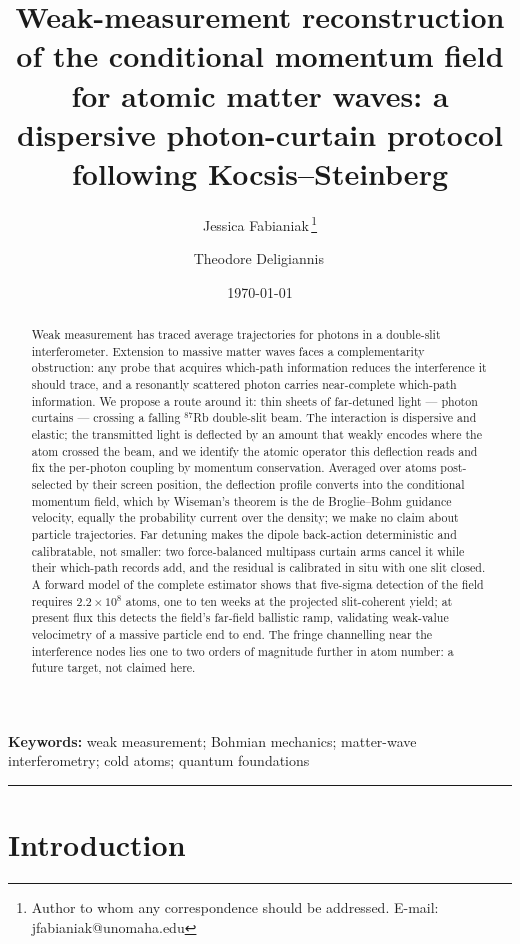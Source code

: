 \documentclass[11pt,a4paper]{article}
\title{Weak-measurement reconstruction of the conditional momentum field for atomic matter waves: a dispersive photon-curtain protocol following Kocsis--Steinberg}
\author[1]{Jessica Fabianiak\,\orcidlink{0009-0004-3872-0422}\thanks{Author to whom any correspondence should be addressed. E-mail: jfabianiak@unomaha.edu}}
\author[2]{Theodore Deligiannis\,\orcidlink{0009-0009-9964-6664}}
\affil[1]{Department of Chemistry, University of Nebraska at Omaha, Omaha, NE 68182, USA}
\affil[2]{Department of Biomechanics, University of Nebraska at Omaha, Omaha, NE 68182, USA}
\date{\today}
\begin{document}
\maketitle

\begin{abstract}
Weak measurement has traced average trajectories for photons in a double-slit interferometer. Extension to massive matter waves faces a complementarity obstruction: any probe that acquires which-path information reduces the interference it should trace, and a resonantly scattered photon carries near-complete which-path information. We propose a route around it: thin sheets of far-detuned light --- photon curtains --- crossing a falling ${}^{87}$Rb double-slit beam. The interaction is dispersive and elastic; the transmitted light is deflected by an amount that weakly encodes where the atom crossed the beam, and we identify the atomic operator this deflection reads and fix the per-photon coupling by momentum conservation. Averaged over atoms post-selected by their screen position, the deflection profile converts into the conditional momentum field, which by Wiseman's theorem is the de Broglie--Bohm guidance velocity, equally the probability current over the density; we make no claim about particle trajectories. Far detuning makes the dipole back-action deterministic and calibratable, not smaller: two force-balanced multipass curtain arms cancel it while their which-path records add, and the residual is calibrated in situ with one slit closed. A forward model of the complete estimator shows that five-sigma detection of the field requires $2.2\times 10^8$ atoms, one to ten weeks at the projected slit-coherent yield; at present flux this detects the field's far-field ballistic ramp, validating weak-value velocimetry of a massive particle end to end. The fringe channelling near the interference nodes lies one to two orders of magnitude further in atom number: a future target, not claimed here.
\end{abstract}

\noindent\textbf{Keywords:} weak measurement; Bohmian mechanics; matter-wave interferometry; cold atoms; quantum foundations

\bigskip
\hrule
\bigskip

\section{Introduction}
\label{sec:intro}
\end{document}
